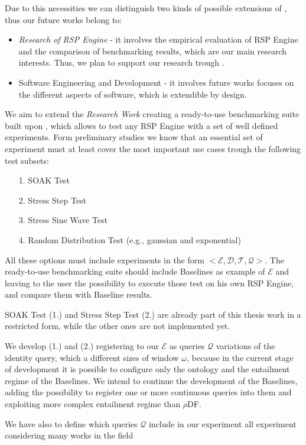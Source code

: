 Due to this necessities we can distinguish two kinds of possible extensions of \namens, thus our future works belong to:
\begin{itemize}
\item \textit{Research of RSP Engine} - it involves the empirical evaluation of RSP Engine and the comparison of benchmarking results, which are our main research interests. Thus, we plan to support our research trough \namens.
\item Software Engineering and Development - it involves future works focuses on the different aspects of \name software, which is extendible by design.
\end{itemize}

\noindent We aim to extend the \textit{Research Work} creating a ready-to-use benchmarking suite built upon \namens, which allows to test any RSP Engine with a set of well defined experiments. Form preliminary studies we know that an essential set of experiment must at least cover the most important use cases trough the following test subsets:
\begin{itemize}
\item[1.] SOAK Test
\item[2.] Stress Step Test
\item[3.] Stress Sine Wave Test
\item[4.] Random Distribution Test (e.g., gaussian and exponential)
\end{itemize}
All these options must include experiments  in the form $<\mathcal{E},\mathcal{D},\mathcal{T},\mathcal{Q}>$. The ready-to-use benchmarking suite should include \name Baselines as example of $\mathcal{E}$ and leaving to the user the possibility to execute those test on his own RSP Engine, and compare them with Baseline results.

SOAK Test (1.) and Stress Step Test (2.) are already part of this thesis work in a restricted form, while the other ones are not implemented yet. 

We develop (1.) and (2.) registering to our $\mathcal{E}$ as queries $\mathcal{Q}$ variations of the identity query, which a different sizes of window $\omega$, because in the current stage of development it is possible to configure only the ontology and the entailment regime of the Baselines. We intend to continue the development of the Baselines, adding the possibility to register one or more continuous queries into them and exploiting more complex entailment regime than $\rho$DF. 

We have also to define which queries $\mathcal{Q}$ include in our experiment all experiment considering many works in the field \cite{DBLP:conf/esws/ScharrenbachUMVB13, Zhang2012, LePhuoc2012c, DBLP:conf/semweb/DellAglioCBCV13}


